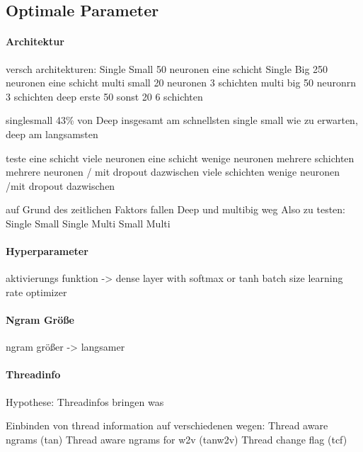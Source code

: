         \subsection{Optimale Parameter}
            \paragraph{Architektur}
                versch architekturen:
                Single Small 50 neuronen eine schicht
                Single Big 250 neuronen eine schicht
                multi small 20 neuronen 3 schichten
                multi big 50 neuronrn 3 schichten
                deep erste 50 sonst 20 6 schichten

                singlesmall 43\% von Deep
                insgesamt am schnellsten single small
                wie zu erwarten,  deep am langsamsten

                teste eine schicht viele neuronen 
                eine schicht wenige neuronen
                mehrere schichten mehrere neuronen / mit dropout dazwischen
                viele schichten wenige neuronen /mit dropout dazwischen

                auf Grund des zeitlichen Faktors fallen Deep und multibig weg
                Also zu testen:
                Single Small
                Single 
                Multi Small
                Multi 

            \paragraph{Hyperparameter}
                aktivierungs funktion
                -> dense layer with softmax or tanh
                batch size
                learning rate
                optimizer

            \paragraph{Ngram Größe}
                ngram größer -> langsamer

            \paragraph{Threadinfo}
                Hypothese:
                Threadinfos bringen was

                Einbinden von thread information auf verschiedenen wegen:
                Thread aware ngrams (tan)
                Thread aware ngrams for w2v (tanw2v)
                Thread change flag (tcf)


